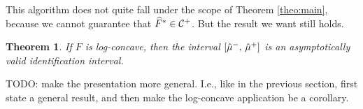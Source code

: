 \documentclass{article}
\theoremstyle{plain}
\newtheorem{theo}[prop]{Theorem}
\theoremstyle{definition}
\theoremstyle{remark}
\begin{document}
This algorithm does not quite fall under the scope of Theorem \ref{theo:main}, because we
cannot guarantee that $\widehat{F}^* \in \mathcal{C}^+$. But the result we want still holds.

\begin{theo}
If $F$ is log-concave, then the interval $[\hat{\mu}^-, \, \hat{\mu}^+]$ is an asymptotically valid identification interval.
\end{theo}

TODO: make the presentation more general. I.e., like in the previous section, first state
a general result, and then make the log-concave application be a corollary.
\end{document}
